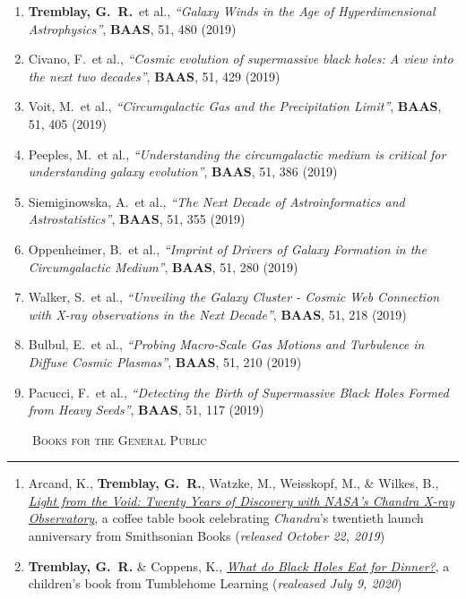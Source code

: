 \documentclass[11pt]{article}
\makeatletter
\def\vhrulefill#1{\leavevmode\leaders\hrule\@height#1\hfill \kern\z@}
\makeatother
\begin{document}
\begin{enumerate}

\item \textbf{Tremblay, G.~R.}~et al., \textit{``Galaxy Winds in the Age of Hyperdimensional Astrophysics''}, \textbf{BAAS}, 51, 480 (2019)

\item Civano, F.~et al., \textit{``Cosmic evolution of supermassive black holes: A view into the next two decades''}, \textbf{BAAS}, 51, 429 (2019)

\item Voit, M.~et al., \textit{``Circumgalactic Gas and the Precipitation Limit''}, \textbf{BAAS}, 51, 405 (2019)

\item Peeples, M.~et al., \textit{``Understanding the circumgalactic medium is critical for understanding galaxy evolution''}, \textbf{BAAS}, 51, 386 (2019)

\item Siemiginowska, A.~et al., \textit{``The Next Decade of Astroinformatics and Astrostatistics''}, \textbf{BAAS}, 51, 355 (2019)


\item Oppenheimer, B.~et al., \textit{``Imprint of Drivers of Galaxy Formation in the Circumgalactic Medium''}, \textbf{BAAS}, 51, 280 (2019)


\item Walker, S.~et al., \textit{``Unveiling the Galaxy Cluster - Cosmic Web Connection with X-ray observations in the Next Decade''}, \textbf{BAAS}, 51, 218 (2019)


\item Bulbul, E.~et al., \textit{``Probing Macro-Scale Gas Motions and Turbulence in Diffuse Cosmic Plasmas''}, \textbf{BAAS}, 51, 210 (2019)


\item Pacucci, F.~et al., \textit{``Detecting the Birth of Supermassive Black Holes Formed from Heavy Seeds''}, \textbf{BAAS}, 51, 117 (2019)


\end{enumerate}



\noindent \textsc{ ~~~~Books for the General Public} \vhrulefill{0.4pt}

\begin{enumerate}


\item Arcand, K., \textbf{Tremblay, G.~R.}, Watzke, M., Weisskopf, M., \& Wilkes, B., \ul{\textit{Light from the Void: Twenty Years of Discovery with NASA's Chandra X-ray Observatory}}, a coffee table book celebrating \textit{Chandra}'s
twentieth launch anniversary from Smithsonian Books (\textit{released October 22, 2019})

\item \textbf{Tremblay, G.~R.} \& Coppens, K., \uline{\textit{What do Black Holes Eat for Dinner?}}, a children's book from Tumblehome Learning (\textit{realeased July 9, 2020})

\end{enumerate}
\end{document}

